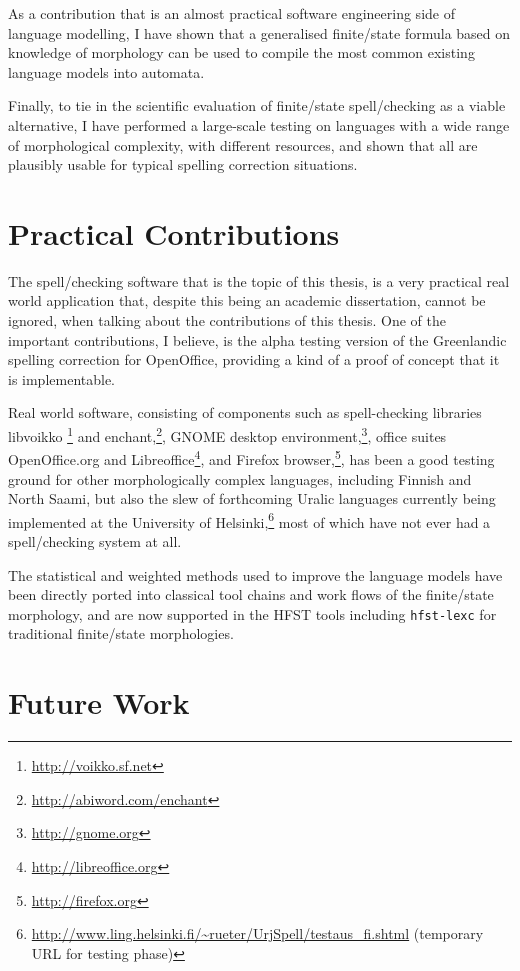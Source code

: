 \documentclass[officiallayout]{unihelcompling}
\begin{document}
As a contribution that is an almost practical software engineering side of
language modelling, I have shown that a generalised finite\-/state formula based
on knowledge of morphology can be used to compile the most common existing
language models into automata.

Finally, to tie in the scientific evaluation of finite\-/state spell\-/checking
as a viable alternative, I have performed a large-scale testing on languages
with a wide range
of morphological complexity, with different resources, and shown
that all are plausibly usable for typical spelling correction situations.


\section{Practical Contributions}
\label{sec:practical-contributions}

The spell\-/checking software that is the topic of this thesis, is a very
practical real world application that, despite this being an academic
dissertation, cannot be ignored, when talking about the contributions of this
thesis. One of the important contributions, I believe, is the alpha testing
version of the Greenlandic spelling correction for OpenOffice, providing a kind
of a proof of concept that it is implementable.

Real world software, consisting of components such as spell-checking libraries libvoikko \footnote{\url{http://voikko.sf.net}} and enchant,\footnote{\url{http://abiword.com/enchant}}, GNOME
desktop environment,\footnote{\url{http://gnome.org}}, office suites OpenOffice.org and Libreoffice\footnote{\url{http://libreoffice.org}}, and Firefox browser,\footnote{\url{http://firefox.org}}, has 
been a good testing ground for other morphologically complex languages,
including Finnish and North Saami, but also the slew of forthcoming Uralic
languages currently being implemented at the University of
Helsinki,\footnote{\url{http://www.ling.helsinki.fi/~rueter/UrjSpell/testaus_fi.shtml}
(temporary URL for testing phase)} most of which have not ever had a
spell\-/checking system at all. 

The statistical and weighted methods used to improve the language models have
been directly ported into classical tool chains and work flows of the 
finite\-/state morphology, and are now supported in the HFST tools including
\texttt{hfst-lexc} for traditional finite\-/state morphologies.

\section{Future Work}
\label{sec:future-work}
\end{document}
